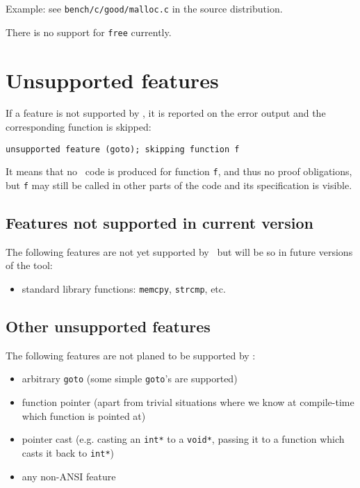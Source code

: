 \documentclass[12pt,a4paper,twoside,openright]{report}
\begin{document}
Example: see \texttt{bench/c/good/malloc.c} in the source distribution.

There is no support for \texttt{free} currently.

\section{Unsupported features}

If a feature is not supported by \caduceus, it is reported on the
error output and the corresponding function is skipped:
\begin{verbatim}
unsupported feature (goto); skipping function f
\end{verbatim}
It means that no \why\ code is produced for function \texttt{f}, and
thus no proof obligations, but \texttt{f} may still be called in other
parts of the code and its specification is visible.

\subsection{Features not supported in current version}
The following features are not yet supported by \caduceus\ but will be
so in future versions of the tool:
\begin{itemize}
\item standard library functions: \texttt{memcpy},
  \texttt{strcmp}, etc.
\end{itemize}

\subsection{Other unsupported features}
The following features are not planed to be supported by \caduceus:
\begin{itemize}
\item arbitrary \texttt{goto} (some simple \texttt{goto}'s are supported)
\item function pointer (apart from trivial situations where we know at
  compile-time which function is pointed at)
\item pointer cast (e.g. casting an \texttt{int*} to a \texttt{void*},
  passing it to a function which casts it back to \texttt{int*})
\item any non-ANSI feature
\end{itemize}



\nocite{*}




\tableofcontents

{}
\printindex
\end{document}
